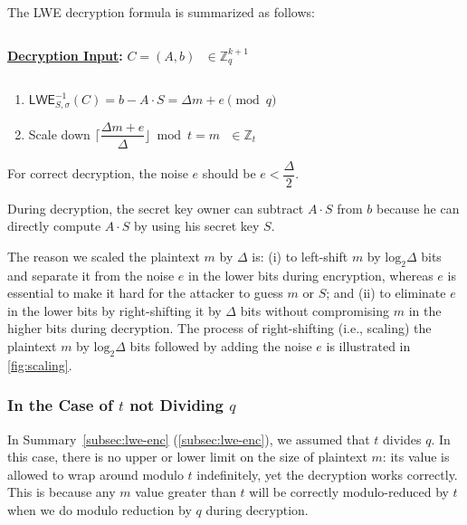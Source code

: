 $ $

The LWE decryption formula is summarized as follows:

$ $

\begin{tcolorbox}[title={\textbf{\tboxlabel{\ref*{subsec:lwe-dec}} LWE Decryption}}]

\textbf{\underline{Decryption Input}:} $C = (A, b) \text{ } \in \mathbb{Z}_q^{k+1}$

$ $

\begin{enumerate}
\item $\textsf{LWE}^{-1}_{S,\sigma}(C) = b - A\cdot S = \Delta  m + e \pmod q$

\item Scale down $\Bigg\lceil\dfrac{ \Delta  m + e } {\Delta}\Bigg\rfloor \bmod t = m \text{ } \in \mathbb{Z}_t$
\end{enumerate}

For correct decryption, the noise $e$ should be $e < \dfrac{\Delta}{2}$.

\end{tcolorbox}

During decryption, the secret key owner can subtract $A \cdot S$ from $b$ because he can directly compute $A \cdot S$ by using his secret key $S$. 

The reason we scaled the plaintext $m$ by $\Delta$ is: (i) to left-shift $m$ by $\text{log}_2\Delta$ bits and separate it from the noise $e$ in the lower bits during encryption, whereas $e$ is essential to make it hard for the attacker to guess $m$ or $S$; and (ii) to eliminate $e$ in the lower bits by right-shifting it by $\Delta$ bits without compromising $m$ in the higher bits during decryption. The process of right-shifting (i.e., scaling) the plaintext $m$ by $\text{log}_2\Delta$ bits followed by adding the noise $e$ is illustrated in \autoref{fig:scaling}.

\subsubsection{In the Case of $t$ not Dividing $q$}
\label{subsubsec:scaling-factor-computation}

In Summary~\ref*{subsec:lwe-enc} (\autoref{subsec:lwe-enc}), we assumed that $t$ divides $q$. In this case, there is no upper or lower limit on the size of plaintext $m$: its value is allowed to wrap around modulo $t$ indefinitely, yet the decryption works correctly. This is because any $m$ value greater than $t$ will be correctly modulo-reduced by $t$ when we do modulo reduction by $q$ during decryption.

